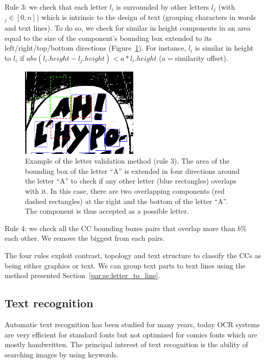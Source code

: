 Rule 3: we check that each letter $l_i$ is surrounded by other letters $l_j$ (with $_j\in{[0,n]}$) which is intrinsic to the design of text (grouping characters in words and text lines).
To do so, we check for similar in height components in an area equal to the size of the component's bounding box extended to its left/right/top/bottom directions (Figure~\ref{fig:in:4_direction}). For instance, $l_i$ is similar in height to $l_i$ if $abs(l_i.height - l_j.height)<a*l_i.height$ ($a=$similarity offset). %


	\begin{figure}[h!]	%
	  \centering
		\includegraphics[width=0.50\textwidth]{4_direction.png}
		\caption[Text extraction neighbourhood validation]{Example of the letter validation method (rule 3). The area of the bounding box of the letter ``A'' is extended in four directions around the letter ``A'' to check if any other letter (blue rectangles) overlaps with it. In this case, there are two overlapping components (red dashed rectangles) at the right and the bottom of the letter ``A''. The component is thus accepted as a possible letter.}
		\label{fig:in:4_direction}
	\end{figure}

Rule 4:
we check all the CC bounding boxes pairs that overlap more than $b$\% each other. We remove the biggest from each pairs.

The four rules exploit contrast, topology and text structure to classify the CCs as being either graphics or text.
We can group text parts to text lines using the method presented Section~\ref{par:se:letter_to_line}.


\subsection{Text recognition} %
\label{sub:te:text_recognition}
Automatic text recognition has been studied for many years, today OCR systems are very efficient for standard fonts but not optimized for comics fonts which are mostly handwritten.
The principal interest of text recognition is the ability of searching images by using keywords.

